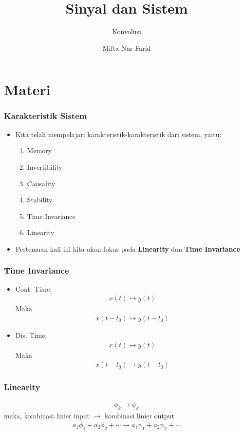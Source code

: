 \documentclass[pdflatex,compress,mathserif]{beamer}
\title{Sinyal dan Sistem}
\subtitle{Konvolusi}
\author{Mifta Nur Farid}
\begin{document}
\maketitle

\section{Materi}

\begin{frame}
	\frametitle{Karakteristik Sistem}
	\begin{itemize}
		\item Kita telah mempelajari karakteristik-karakteristik dari sistem, yaitu:
		\begin{multicols}{2}
			\begin{enumerate}
				\item Memory
				\item Invertibility
				\item Causality
				\item Stability
				\item Time Invariance
				\item Linearity
			\end{enumerate}
		\end{multicols}
		\item Pertemuan kali ini kita akan fokus pada \textbf{Linearity} dan \textbf{Time Invariance}
	\end{itemize}
\end{frame}

\begin{frame}
	\frametitle{Time Invariance}
	\begin{itemize}
		\item Cont. Time:
		\begin{align*}
			x(t) \rightarrow y(t)
		\end{align*}
		Maka
		\begin{align*}
			x(t-t_0) \rightarrow y(t-t_0)
		\end{align*}
		\item Dis. Time:
		\begin{align*}
		x(t) \rightarrow y(t)
		\end{align*}
		Maka
		\begin{align*}
		x(t-t_0) \rightarrow y(t-t_0)
		\end{align*}
	\end{itemize}
\end{frame}

\begin{frame}
	\frametitle{Linearity}
	\begin{align*}
		\phi_k \rightarrow \psi_k
	\end{align*}
	maka, kombinasi linier input $\rightarrow$ kombinasi linier output
	\begin{align*}
		a_1\phi_1 + a_2\phi_2 + \cdots \rightarrow a_1\psi_1 + a_2\psi_2 + \cdots
	\end{align*}
\end{frame}
\end{document}
